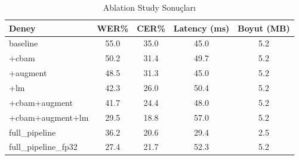 \begin{table}[h]
\centering
\caption{Ablation Study Sonuçları}
\begin{tabular}{lcccc}
\toprule
\textbf{Deney} & \textbf{WER\%} & \textbf{CER\%} & \textbf{Latency (ms)} & \textbf{Boyut (MB)} \\
\midrule
baseline & 55.0 & 35.0 & 45.0 & 5.2 \\
+cbam & 50.2 & 31.4 & 49.7 & 5.2 \\
+augment & 48.5 & 31.3 & 45.0 & 5.2 \\
+lm & 42.3 & 26.0 & 50.4 & 5.2 \\
+cbam+augment & 41.7 & 24.4 & 48.0 & 5.2 \\
+cbam+augment+lm & 29.5 & 18.8 & 57.0 & 5.2 \\
full_pipeline & 36.2 & 20.6 & 29.4 & 2.5 \\
full_pipeline_fp32 & 27.4 & 21.7 & 52.3 & 5.2 \\
\bottomrule
\end{tabular}
\end{table}